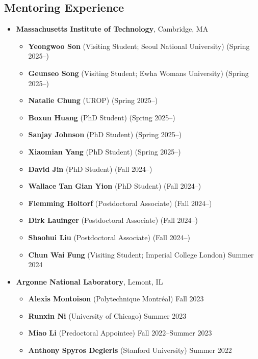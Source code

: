\subsection*{Mentoring Experience}
\begin{itemize}[itemsep=1pt, parsep=0pt,leftmargin=*]
  \item[] \textbf{Massachusetts Institute of Technology}, Cambridge, MA
    \begin{itemize}[itemsep=1pt, parsep=0pt,leftmargin=*]
    \item[] \textbf{Yeongwoo Son} (Visiting Student; Seoul National University) \hfill (Spring 2025--)
    \item[] \textbf{Geunseo Song} (Visiting Student; Ewha Womans University) \hfill (Spring 2025--)
    \item[] \textbf{Natalie Chung} (UROP) \hfill (Spring 2025--)
    \item[] \textbf{Boxun Huang} (PhD Student) \hfill (Spring 2025--)
    \item[] \textbf{Sanjay Johnson} (PhD Student) \hfill (Spring 2025--)
    \item[] \textbf{Xiaomian Yang} (PhD Student) \hfill (Spring 2025--)
    \item[] \textbf{David Jin} (PhD Student) \hfill (Fall 2024--)
    \item[] \textbf{Wallace Tan Gian Yion} (PhD Student) \hfill (Fall 2024--)
    \item[] \textbf{Flemming Holtorf} (Postdoctoral Associate) \hfill (Fall 2024--)
    \item[] \textbf{Dirk Lauinger} (Postdoctoral Associate) \hfill (Fall 2024--)
    \item[] \textbf{Shaohui Liu} (Postdoctoral Associate) \hfill (Fall 2024--)
    \item[] \textbf{Chun Wai Fung} (Visiting Student; Imperial College London) \hfill Summer 2024
  \end{itemize}
\item[] \textbf{Argonne National Laboratory}, Lemont, IL
  \begin{itemize}[itemsep=1pt, parsep=0pt,leftmargin=*]
  \item[] \textbf{Alexis Montoison} (Polytechnique Montr\'{e}al) \hfill Fall 2023
  \item[] \textbf{Runxin Ni} (University of Chicago) \hfill Summer 2023
  \item[] \textbf{Miao Li} (Predoctoral Appointee) \hfill Fall 2022--Summer 2023
  \item[] \textbf{Anthony Spyros Degleris} (Stanford University) \hfill Summer 2022

\end{itemize}
\end{itemize}
